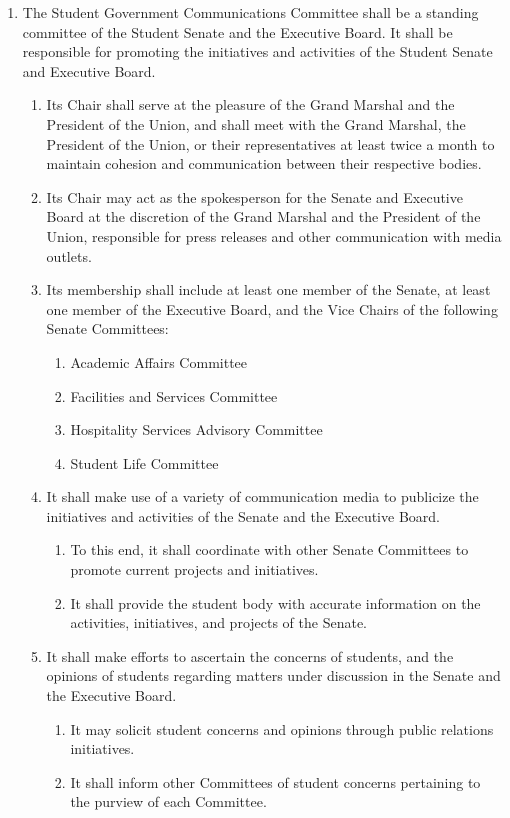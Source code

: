 \documentclass{bylaws}
\begin{document}
\begin{enumerate}
\item The Student Government Communications Committee shall be a standing committee of the Student Senate and the Executive
Board. It shall be responsible for promoting the initiatives and activities of the Student Senate and Executive Board.
\begin{enumerate}
\item Its Chair shall serve at the pleasure of the Grand Marshal and the President of the Union, and shall meet with the Grand
Marshal, the President of the Union, or their representatives at least twice a month to maintain cohesion and
communication between their respective bodies.
\item Its Chair may act as the spokesperson for the Senate and Executive Board at the discretion of the Grand Marshal and the
President of the Union, responsible for press releases and other communication with media outlets.
\item Its membership shall include at least one member of the Senate, at least one member of the Executive Board, and the Vice
Chairs of the following Senate Committees:
\begin{enumerate}
\item Academic Affairs Committee
\item Facilities and Services Committee
\item Hospitality Services Advisory Committee
\item Student Life Committee
\end{enumerate}
\item It shall make use of a variety of communication media to publicize the initiatives and activities of the Senate and the
Executive Board.
\begin{enumerate}
\item To this end, it shall coordinate with other Senate Committees to promote current projects and initiatives.
\item It shall provide the student body with accurate information on the activities, initiatives, and projects of the Senate.
\end{enumerate}
\item It shall make efforts to ascertain the concerns of students, and the opinions of students regarding matters under discussion
in the Senate and the Executive Board.
\begin{enumerate}
\item It may solicit student concerns and opinions through public relations initiatives.
\item It shall inform other Committees of student concerns pertaining to the purview of each Committee.
\end{enumerate}


\end{enumerate}
\end{enumerate}
\end{document}
